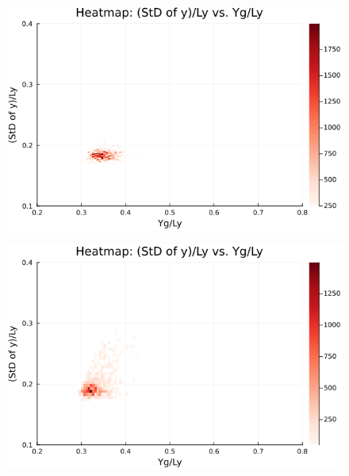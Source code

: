 \begin{figure}[H]
  \centering
  \includegraphics[scale=0.6]{image/RaRtmap_heat/2023-11-15T11:53:37.697__chi1.265_Ay50_rho0.4_T0.43_dT0.04_Rd0.0_Rt0.5_Ra0.0_g0.0003999718779659611_run4.0e7_output.png}
  \label{}
\end{figure}

\begin{figure}[H]
  \centering
  \includegraphics[scale=0.6]{image/RaRtmap_heat/2023-11-15T12:45:26.303__chi1.265_Ay50_rho0.4_T0.43_dT0.04_Rd0.0_Rt0.5_Ra0.4693845_g0.0003999718779659611_run4.0e7_output.png}
  \label{}
\end{figure}

